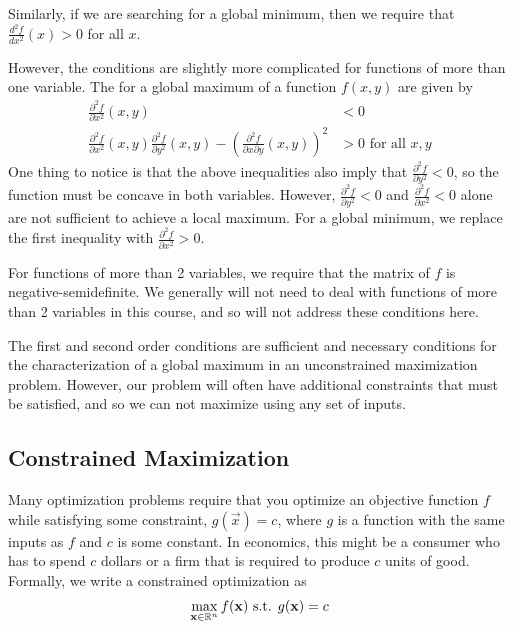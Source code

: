 Similarly, if we are searching for a global minimum, then we require that $\frac{d^2f}{dx^2}(x) > 0$ for all $x$. 

However, the conditions are slightly more complicated for functions of more than one variable. The  for a global maximum of a function $f(x, y)$ are given by
\begin{align*}
    \frac{\partial^2f}{\partial x^2}(x, y) &< 0 \\ 
    \frac{\partial^2f}{\partial x^2}(x, y) \frac{\partial^2f}{\partial y^2}(x, y) - \left(\frac{\partial^2f}{\partial x \partial y}(x, y)\right)^2 &> 0 \text{ for all $x, y$}
\end{align*}
One thing to notice is that the above inequalities also imply that $\frac{\partial^2f}{\partial y^2} < 0$, so the function must be concave in both variables. However, $\frac{\partial^2f}{\partial y^2} < 0$ and $\frac{\partial^2f}{\partial x^2} < 0$ alone are not sufficient to achieve a local maximum. For a global minimum, we replace the first inequality with $\frac{\partial^2f}{\partial x^2} > 0$. 

For functions of more than 2 variables, we require that the  matrix of $f$ is negative-semidefinite. We generally will not need to deal with functions of more than 2 variables in this course, and so will not address these conditions here. 

The first and second order conditions are sufficient and necessary conditions for the characterization of a global maximum in an unconstrained maximization problem. However, our problem will often have additional constraints that must be satisfied, and so we can not maximize using any set of inputs.

\subsection*{Constrained Maximization}
Many optimization problems require that you optimize an objective function $f$ while satisfying some constraint, $g(\vec{x}) = c$, where $g$ is a function with the same inputs as $f$ and $c$ is some constant. In economics, this might be a consumer who has to spend $c$ dollars or a firm that is required to produce $c$ units of good. Formally, we write a constrained optimization as
\begin{align*}
    \max_{\mathbf{x} \in \mathbb{R}^n} f(\mathbf{x}) \text{ s.t. } g(\mathbf{x}) = c
\end{align*}

